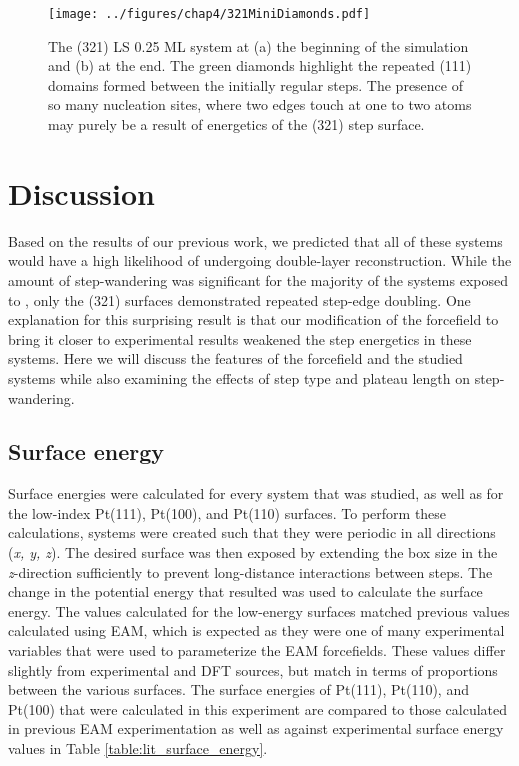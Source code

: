 \begin{figure}
\centering
\texttt{[image: ../figures/chap4/321MiniDiamonds.pdf]}
\caption{The (321) LS 0.25 ML system at (a) the beginning of the simulation and
(b) at the end. The green diamonds highlight the repeated (111) domains formed
between the initially regular steps. The presence of so many nucleation sites,
where two edges touch at one to two atoms may purely be a result of energetics
of the (321) step surface.}
\label{fig:diamonds}
\end{figure}

\section{Discussion}
Based on the results of our previous work\citep{Michalka:2013aa}, we predicted
that all of these systems would have a high likelihood of undergoing
double-layer reconstruction. While the amount of step-wandering was significant
for the majority of the systems exposed to , only the (321) surfaces
demonstrated repeated step-edge doubling. One explanation for this surprising
result is that our modification of the  forcefield to bring it
closer to experimental results weakened the  step energetics
in these systems. Here we will discuss the features of the forcefield and the
studied systems while also examining the effects of step type and plateau
length on step-wandering.

\subsection{Surface energy}
Surface energies were calculated for every system that was studied, as well as
for the low-index Pt(111), Pt(100), and Pt(110) surfaces.  To perform these
calculations, systems were created such that they were periodic in all
directions ({\em x, y, z}). The desired surface was then exposed by extending
the box size in the {\em z}-direction sufficiently to prevent long-distance
interactions between steps.  The change in the potential energy that resulted
was used to calculate the surface energy.  The values calculated for the
low-energy surfaces matched previous values calculated using EAM, which is
expected as they were one of many experimental variables that were used to
parameterize the EAM forcefields.\citep{Foiles:1986ky} These values differ
slightly from experimental\citep{Tyson:1977xe, De-Boer:1988tg, Galeev:1980pt} and
DFT\citep{Vitos:1998qq} sources, but match in terms of proportions between the
various surfaces.  The surface energies of Pt(111), Pt(110), and Pt(100) that
were calculated in this experiment are compared to those calculated in previous
EAM experimentation \citep{Foiles:1986ky} as well as against experimental
surface energy values in Table \ref{table:lit_surface_energy}.

